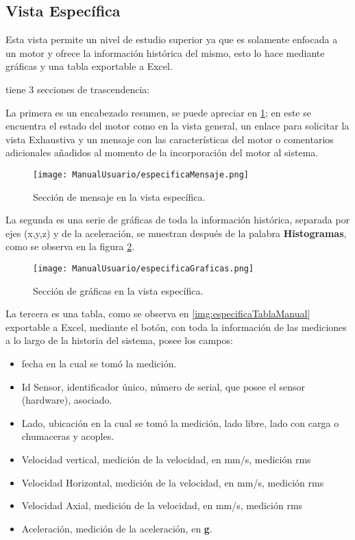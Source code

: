 \subsection{Vista Específica}
Esta vista permite un nivel de estudio superior ya que es solamente enfocada
a un motor y ofrece la información histórica del mismo, esto lo hace mediante
gráficas y una tabla exportable a Excel.

tiene 3 secciones de trascendencia:

La primera es un encabezado resumen,
se puede apreciar en \ref{img:especificaHeaderManual}; en este se encuentra
el estado del motor como en la vista general, un enlace para solicitar la
vista Exhaustiva y un mensaje con las características del motor o
comentarios adicionales añadidos al momento de la incorporación del motor al
sistema.

    \begin{figure}[H]
		\centering
        \caption{Sección de mensaje en la vista específica. }
        \texttt{[image: ManualUsuario/especificaMensaje.png]}
        \label{img:especificaHeaderManual}
	\end{figure}

La segunda es una serie de gráficas de toda la información histórica, separada
por ejes (x,y,z) y de la aceleración, se muestran después de la palabra
\textbf{Histogramas}, como se observa en la figura \ref{img:especificaGraficasManual}.

    \begin{figure}[H]
		\centering
        \caption{Sección de gráficas en la vista específica. }
        \texttt{[image: ManualUsuario/especificaGraficas.png]}
        \label{img:especificaGraficasManual}
	\end{figure}

La tercera es una tabla, como se observa en \ref{img:especificaTablaManual}
exportable a Excel, mediante el botón, con toda la información de las mediciones
a lo largo de la historia del sistema, posee los campos:
\begin{itemize}
    \item fecha en la cual se tomó la medición.
    \item Id Sensor, identificador único, número de serial, que posee el sensor
        (hardware), asociado.
    \item Lado, ubicación en la cual se tomó la medición, lado libre, lado con
        carga o chumaceras y acoples.
    \item Velocidad vertical, medición de la velocidad, en mm/s, medición rms
    \item Velocidad Horizontal, medición de la velocidad, en mm/s, medición rms
    \item Velocidad Axial, medición de la velocidad, en mm/s, medición rms
    \item Aceleración, medición de la aceleración, en \textbf{g}.
\end{itemize}

